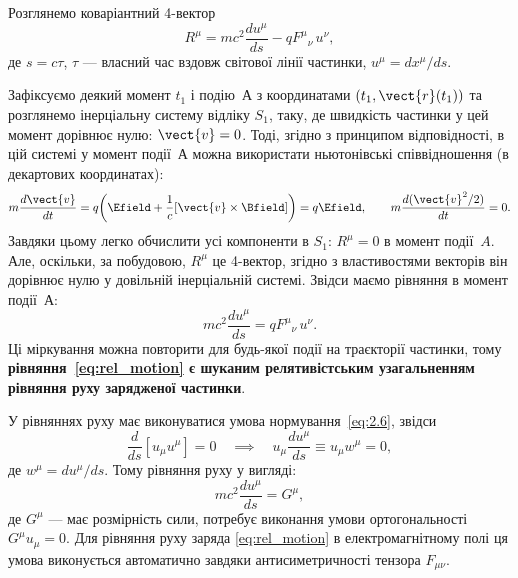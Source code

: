 Розглянемо коваріантний 4-вектор
\begin{equation*}
    R^{\mu} = mc^2\frac{du^{\mu}}{ds} - qF^{\mu}{}_{\nu}\,u^{\nu},
\end{equation*}
де $s=c\tau$, $\tau$ --- власний час вздовж світової лінії частинки, $u^{\mu}=dx^{\mu}/ds$.

Зафіксуємо деякий момент $t_1$ і подію~А з координатами $(t_1,\vect{r}(t_1))$ та розглянемо інерціальну систему відліку
$S_1$, таку, де швидкість частинки у цей момент дорівнює нулю: $\vect{v}=0$. Тоді, згідно з принципом відповідності, в
цій системі у момент події~А можна використати ньютонівські співвідношення (в декартових координатах):
\begin{equation*}
    m\frac{d\vect{v}}{dt} = q\!\left(\Efield
    + \frac{1}{c}[\vect{v}\times\Bfield]\right) = q\Efield,
    \qquad
    m\frac{d(\vect{v}^2/2)}{dt} = 0.
\end{equation*}
Завдяки цьому легко обчислити усі компоненти в $S_1$: $R^{\mu}=0$ в момент події~$A$. Але, оскільки, за побудовою,
$R^{\mu}$ це 4-вектор, згідно з властивостями векторів він дорівнює нулю у довільній інерціальній системі. Звідси маємо
рівняння в момент події~А:
\begin{equation}\label{eq:rel_motion}
    mc^2\frac{du^{\mu}}{ds} = qF^{\mu}{}_{\nu}\,u^{\nu}.
\end{equation}
Ці міркування можна повторити для будь-якої події на траєкторії частинки, тому \textbf{рівняння~\eqref{eq:rel_motion} є
    шуканим релятивістським узагальненням рівняння руху зарядженої частинки}.

У рівняннях руху має виконуватися умова нормування~\eqref{eq:2.6}, звідси
\begin{equation*}
\frac{d}{ds}[u_\mu u^\mu]=0\quad \implies \quad u_\mu \frac{du^\mu}{ds}\equiv  u_\mu w^\mu=0,
\end{equation*}
де $w^\mu=du^\mu/ds$.  Тому рівняння руху у вигляді:
\begin{equation}\label{eq:force_orthohomality}
    mc^2\frac{du^\mu}{ds}=G^\mu,
\end{equation}
де $G^\mu$ --- має розмірність сили, потребує виконання умови ортогональності $G^\mu u_\mu=0$. Для рівняння руху заряда \eqref{eq:rel_motion} в електромагнітному  полі ця умова виконується автоматично завдяки антисиметричності тензора $F_{\mu\nu}$.

